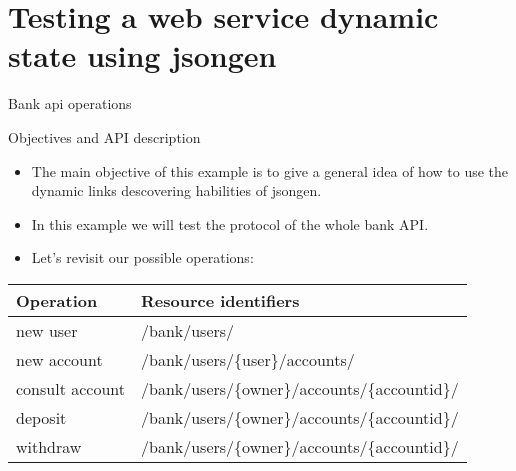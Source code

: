 \section{Testing a web service dynamic state using jsongen}

\begin{frame}{Bank api operations}
  \begin{figure}
    \centering
  \end{figure}
\end{frame}

\begin{frame}{Objectives and API description}%
  \begin{itemize}
  \item The main objective of this example is to give a general idea
    of how to use the dynamic links descovering habilities of jsongen.

  \item In this example we will test the protocol of the whole bank API.%

  \item Let's revisit our possible operations:%
  \end{itemize}

  \centering
  \begin{tabular}{| l | l |}
    \hline
    \textbf{Operation} & \textbf{Resource identifiers} \\ \hline
    new user           & /bank/users/                  \\ \hline
    new account        & /bank/users/\{user\}/accounts/  \\ \hline
    consult account    & /bank/users/\{owner\}/accounts/\{accountid\}/ \\ \hline
    deposit            & /bank/users/\{owner\}/accounts/\{accountid\}/ \\ \hline
    withdraw           & /bank/users/\{owner\}/accounts/\{accountid\}/ \\ \hline
  \end{tabular}
  \centering

\end{frame}

